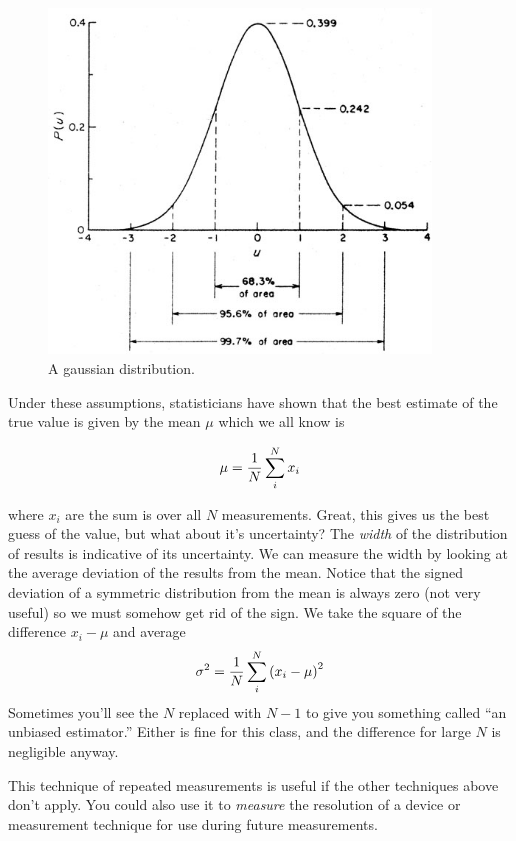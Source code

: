 \begin{figure}
\includegraphics[width=4in]{../images/gaussian.jpg}
\caption{A gaussian distribution.}
\label{fig:gaussian}
\end{figure}

Under these assumptions, statisticians have shown that the best estimate of the true value is given by the mean $\mu$ which we all know is

\begin{equation}
\mu = { 1 \over N } \sum_i^N x_i
\end{equation}

where $x_i$ are the sum is over all $N$ measurements.  Great, this gives us the best guess of the value, but what about it's uncertainty?  The {\em width} of the distribution of results is indicative of its uncertainty.  We can measure the width by looking at the average deviation of the results from the mean.  Notice that the signed deviation of a symmetric distribution from the mean is always zero (not very useful) so we must somehow get rid of the sign.  We take the square of the difference $x_i - \mu$ and average
\begin{equation}
\sigma^2 = {1\over N} \sum_i^N \left( x_i - \mu \right)^2
\end{equation}
Sometimes you'll see the $N$ replaced with $N-1$ to give you something called ``an unbiased estimator.''  Either is fine for this class, and the difference for large $N$ is negligible anyway.

This technique of repeated measurements is useful if the other techniques above don't apply.  You could also use it to {\em measure} the resolution of a device or measurement technique for use during future measurements.

